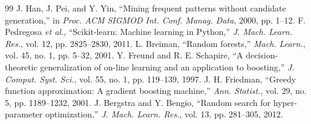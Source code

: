 \documentclass[conference]{IEEEtran}
\begin{document}
\begin{thebibliography}{99}
 J. Han, J. Pei, and Y. Yin, ``Mining frequent patterns without candidate generation,'' in \emph{Proc. ACM SIGMOD Int. Conf. Manag. Data}, 2000, pp. 1--12.
 F. Pedregosa \emph{et al.}, ``Scikit-learn: Machine learning in Python,'' \emph{J. Mach. Learn. Res.}, vol. 12, pp. 2825--2830, 2011.
 L. Breiman, ``Random forests,'' \emph{Mach. Learn.}, vol. 45, no. 1, pp. 5--32, 2001.
 Y. Freund and R. E. Schapire, ``A decision-theoretic generalization of on-line learning and an application to boosting,'' \emph{J. Comput. Syst. Sci.}, vol. 55, no. 1, pp. 119--139, 1997.
 J. H. Friedman, ``Greedy function approximation: A gradient boosting machine,'' \emph{Ann. Statist.}, vol. 29, no. 5, pp. 1189--1232, 2001.
 J. Bergstra and Y. Bengio, ``Random search for hyper-parameter optimization,'' \emph{J. Mach. Learn. Res.}, vol. 13, pp. 281--305, 2012.
\end{thebibliography}
\end{document}

